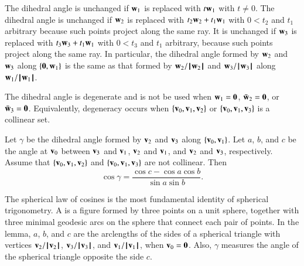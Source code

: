 \begin{remark}\label{rem:dih}
  The dihedral angle is unchanged if ${\mathbf w}_1$ is replaced with $t {\mathbf w}_1$ with
  $t\ne0$. The dihedral angle is unchanged if ${\mathbf w}_2$ is replaced with
  $t_2 {\mathbf w}_2 + t_1 {\mathbf w}_1$ with $0 < t_2$ and $t_1$ arbitrary because
  such points project along the same ray.  It is unchanged if ${\mathbf w}_3$ is
  replaced with $t_3 {\mathbf w}_3 + t_1 {\mathbf w}_1$ with $0 < t_3$ and $t_1$
  arbitrary, because such points project along the same ray.  In
  particular, the dihedral angle formed by ${\mathbf w}_2$ and ${\mathbf w}_3$ along
  $\{{\mathbf 0},{\mathbf w}_1\}$ is the same as that formed by ${\mathbf w}_2/{{\hskip0.1em|\hskip-0.15em|\hskip0.1em}{\mathbf w}_2{\hskip0.1em|\hskip-0.15em|\hskip0.1em}}$ and
  ${\mathbf w}_3/{{\hskip0.1em|\hskip-0.15em|\hskip0.1em}{\mathbf w}_3{\hskip0.1em|\hskip-0.15em|\hskip0.1em}}$ along ${\mathbf w}_1/{{\hskip0.1em|\hskip-0.15em|\hskip0.1em}{\mathbf w}_1{\hskip0.1em|\hskip-0.15em|\hskip0.1em}}$.
\end{remark}

The dihedral angle is degenerate and is not be used when ${\mathbf w}_1 =
{\mathbf 0}$, $\bar {{\mathbf w}}_2 = {\mathbf 0}$, or $\bar {{\mathbf w}}_3 = {\mathbf 0}$.  Equivalently, degeneracy
occurs when $\{{\mathbf v}_0,{\mathbf v}_1,{\mathbf v}_2\}$ or $\{{\mathbf v}_0,{\mathbf v}_1,{\mathbf v}_3\}$ is a collinear set.

\begin{lemma}\label{lemma:sloc}
    Let $\gamma$ be the
  dihedral angle formed by ${\mathbf v}_2$ and ${\mathbf v}_3$ along $\{{\mathbf v}_0,{\mathbf v}_1\}$.  Let
  $a$, $b$, and $c$ be the angle at ${\mathbf v}_0$ between ${\mathbf v}_3$ and ${\mathbf v}_1$, ${\mathbf v}_2$
  and ${\mathbf v}_1$, and ${\mathbf v}_2$ and ${\mathbf v}_3$, respectively. %
  Assume that $\{{\mathbf v}_0,{\mathbf v}_1,{\mathbf v}_2\}$ and $\{{\mathbf v}_0,{\mathbf v}_1,{\mathbf v}_3\}$ are not collinear.
  Then
  \[ \cos\gamma = \frac{\cos c - \cos a \cos b}{\sin
      a\sin b}.\] 
\end{lemma}
%
%
%

\begin{remark}
  The spherical law of cosines is the most fundamental identity of
  spherical trigonometry.  A  is a figure
  formed by three points on a unit sphere, together with three minimal
  geodesic arcs on the sphere that connect each pair of points.  In
  the lemma, $a$, $b$, and $c$ are the arclengths of the sides of a
  spherical triangle with vertices ${\mathbf v}_2/{{\hskip0.1em|\hskip-0.15em|\hskip0.1em}{\mathbf v}_2{\hskip0.1em|\hskip-0.15em|\hskip0.1em}}$,
  ${\mathbf v}_3/{{\hskip0.1em|\hskip-0.15em|\hskip0.1em}{\mathbf v}_3{\hskip0.1em|\hskip-0.15em|\hskip0.1em}}$, and ${\mathbf v}_1/{{\hskip0.1em|\hskip-0.15em|\hskip0.1em}{\mathbf v}_1{\hskip0.1em|\hskip-0.15em|\hskip0.1em}}$, when ${\mathbf v}_0={\mathbf 0}$.
  Also, $\gamma$ measures the angle of the spherical triangle opposite
  the side $c$.  %
\end{remark}


